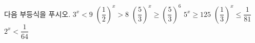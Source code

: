 다음 부등식을 푸시오.
 $3^{x}<9$
 $\left(\dfrac{1}{2}\right)^{x}>8$
 $\left(\dfrac{5}{3}\right)^{x}\ge\left(\dfrac{5}{3}\right)^{6}$
 $5^{x}\ge 125$
 $\left(\dfrac{1}{3}\right)^{x}\le\dfrac{1}{81}$
 $2^{x}<\dfrac{1}{64}$
